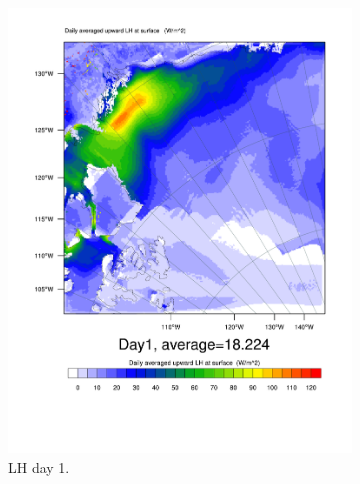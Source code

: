 \begin{figure}
\centering
	\begin{subfigure}{0.48\textwidth}
		\includegraphics[width=\textwidth]{results/control/LH_Day1.pdf}
		\caption{LH day 1.}
		\label{subfig:lh_r1Day1}
	\end{subfigure}
	\quad
	\begin{subfigure}{0.48\textwidth}
		\centering

\end{subfigure}
\end{figure}
